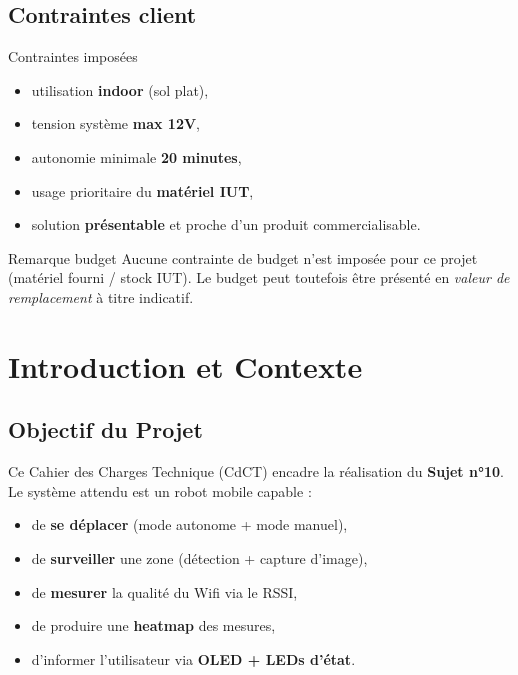 \documentclass[a4paper,12pt]{report}
\begin{document}
\section{Contraintes client}
\begin{infobox}{Contraintes imposées}
\begin{itemize}
    \item utilisation \textbf{indoor} (sol plat),
    \item tension système \textbf{max 12V},
    \item autonomie minimale \textbf{20 minutes},
    \item usage prioritaire du \textbf{matériel IUT},
    \item solution \textbf{présentable} et proche d’un produit commercialisable.
\end{itemize}
\end{infobox}

\begin{infobox}{Remarque budget}
Aucune contrainte de budget n’est imposée pour ce projet (matériel fourni / stock IUT).
Le budget peut toutefois être présenté en \textit{valeur de remplacement} à titre indicatif.
\end{infobox}

\chapter{Introduction et Contexte}

\section{Objectif du Projet}
Ce Cahier des Charges Technique (CdCT) encadre la réalisation du \textbf{Sujet n°10}.
Le système attendu est un robot mobile capable :
\begin{itemize}
    \item de \textbf{se déplacer} (mode autonome + mode manuel),
    \item de \textbf{surveiller} une zone (détection + capture d’image),
    \item de \textbf{mesurer} la qualité du Wifi via le RSSI,
    \item de produire une \textbf{heatmap} des mesures,
    \item d’informer l’utilisateur via \textbf{OLED + LEDs d’état}.
\end{itemize}
\end{document}
